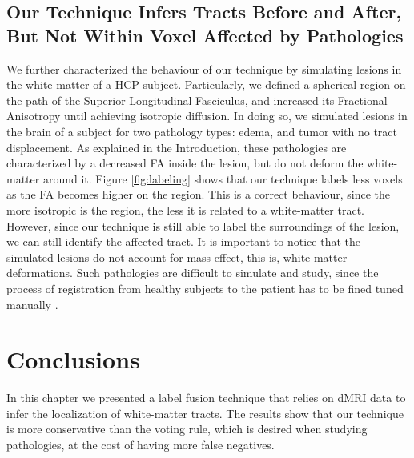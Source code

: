 \subsection{Our Technique Infers Tracts Before and After, But Not Within 
            Voxel Affected by Pathologies}
We further characterized the behaviour of our technique by simulating lesions
in the white-matter of a HCP subject. Particularly, we defined a spherical region
on the path of the Superior Longitudinal Fasciculus, and increased its
Fractional Anisotropy until achieving isotropic diffusion. In doing so, we
simulated lesions in the brain of a subject for two pathology types:
edema, and tumor with no tract displacement. As explained in the Introduction,
these pathologies are characterized by a decreased FA inside
the lesion, but do not deform the white-matter around it. Figure \ref{fig:labeling}
shows that our technique labels less voxels as the FA becomes higher on the
region. This is a correct behaviour, since the more isotropic is the region,
the less it is related to a white-matter tract. However, since our technique
is still able to label the surroundings of the lesion, we can still identify
the affected tract. It is important to notice that the simulated lesions do not
account for mass-effect, this is, white matter deformations. Such pathologies
are difficult to simulate and study, since the process of registration from
healthy subjects to the patient has to be fined tuned manually . 

\section{Conclusions}
In this chapter we presented a label fusion technique that relies on dMRI
data to infer the localization of white-matter tracts. The results show that
our technique is more conservative than the voting rule, which is desired when
studying pathologies, at the cost of having more false negatives.


\chapterbib
